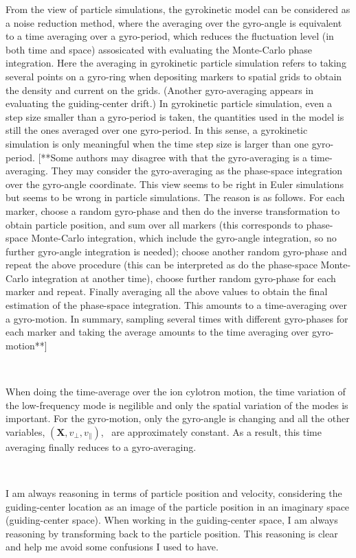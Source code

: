 \documentclass{llncs}
\begin{document}
From the view of particle simulations, the gyrokinetic model can be
considered as a noise reduction method, where the averaging over the
gyro-angle is equivalent to a time averaging over a gyro-period, which reduces
the fluctuation level (in both time and space) assosicated with evaluating the
Monte-Carlo phase integration. Here the averaging in gyrokinetic particle
simulation refers to taking several points on a gyro-ring when depositing
markers to spatial grids to obtain the density and current on the grids.
(Another gyro-averaging appears in evaluating the guiding-center drift.) In
gyrokinetic particle simulation, even a step size smaller than a gyro-period
is taken, the quantities used in the model is still the ones averaged over one
gyro-period. In this sense, a gyrokinetic simulation is only meaningful when
the time step size is larger than one gyro-period. [**Some authors may
disagree with that the gyro-averaging is a time-averaging. They may consider
the gyro-averaging as the phase-space integration over the gyro-angle
coordinate. This view seems to be right in Euler simulations but seems to be
wrong in particle simulations. The reason is as follows. For each marker,
choose a random gyro-phase and then do the inverse transformation to obtain
particle position, and sum over all markers (this corresponds to phase-space
Monte-Carlo integration, which include the gyro-angle integration, so no
further gyro-angle integration is needed); choose another random gyro-phase
and repeat the above procedure (this can be interpreted as do the phase-space
Monte-Carlo integration at another time), choose further random gyro-phase for
each marker and repeat. Finally averaging all the above values to obtain the
final estimation of the phase-space integration. This amounts to a
time-averaging over a gyro-motion. In summary, sampling several times with
different gyro-phases for each marker and taking the average amounts to the
time averaging over gyro-motion**]

\

When doing the time-average over the ion cylotron motion, the time variation
of the low-frequency mode is negilible and only the spatial variation of the
modes is important. For the gyro-motion, only the gyro-angle is changing and
all the other variables, $(\mathbf{X}, v_{\perp}, v_{\parallel})$, \ are
approximately constant. As a result, this time averaging finally reduces to a
gyro-averaging.

\

I am always reasoning in terms of particle position and velocity, considering
the guiding-center location as an image of the particle position in an
imaginary space (guiding-center space). When working in the guiding-center
space, I am always reasoning by transforming back to the particle position.
This reasoning is clear and help me avoid some confusions I used to have.
\end{document}
